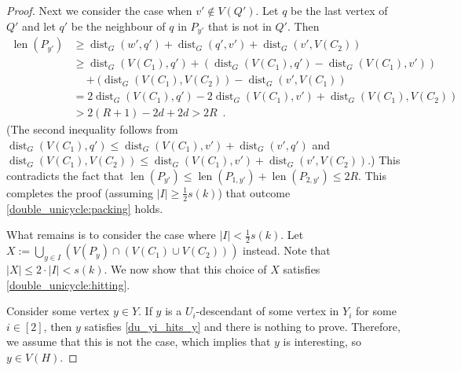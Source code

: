 \documentclass{patmorin}
\newcommand{\gwen}[1]{\textcolor{Purple}{Gwen: #1}}
\newcommand{\piotr}[1]{\textcolor{red}{Piotr: #1}}
\DeclareMathOperator{\len}{len}
\DeclareMathOperator{\dist}{dist}
\begin{document}
\begin{proof}
    Next we consider the case when $v'\notin V(Q')$. 
    Let $q$ be the last vertex of $Q'$ and let $q'$ be the neighbour of $q$ in $P_{y'}$ that is not in $Q'$.  Then
    \begin{align*}
    \len(P_{y'}) 
        & \ge \dist_G(w',q') + \dist_G(q',v') + \dist_G(v',V(C_2)) \\
        & \ge \dist_G(V(C_1),q') + (\dist_G(V(C_1),q') - \dist_G(V(C_1),v')) \\
        & \quad {} + (\dist_G(V(C_1),V(C_2))-\dist_G(v',V(C_1)) \\
        & = 2\dist_G(V(C_1),q') - 2\dist_G(V(C_1),v') + \dist_G(V(C_1),V(C_2)) \\
        & > 2(R+1) - 2d + 2d > 2R \enspace .
    \end{align*}
    (The second inequality follows from $\dist_G(V(C_1),q')\leq \dist_G(V(C_1),v')+\dist_G(v',q')$ and
    $\dist_G(V(C_1),V(C_2))\le \dist_G(V(C_1),v')+\dist_G(v',V(C_2))$.) This contradicts the fact that $\len(P_{y'})\le \len(P_{1,y'})+\len(P_{2,y'})\le 2R$.  This completes the proof (assuming $|I|\ge\tfrac{1}{2}s(k)$) that outcome \cref{double_unicycle:packing} holds.


    What remains is to consider the case where $|I|<\frac{1}{2}s(k)$.  Let $X:=\bigcup_{y\in I}\left( V(P_y)\cap(V(C_1)\cup V(C_2))\right)$ instead. 
    Note that $|X|\leq 2\cdot|I| < s(k)$. 
    We now show that this choice of $X$ satisfies \cref{double_unicycle:hitting}.

    Consider some vertex $y\in Y$.  If $y$ is a $U_i$-descendant of some vertex in $Y_i$ for some $i\in[2]$, then $y$ satisfies \cref{du_yi_hits_y} and there is nothing to prove.  Therefore, we assume that this is not the case, which implies that $y$ is interesting, so $y\in V(H)$.


\end{proof}
\end{document}
